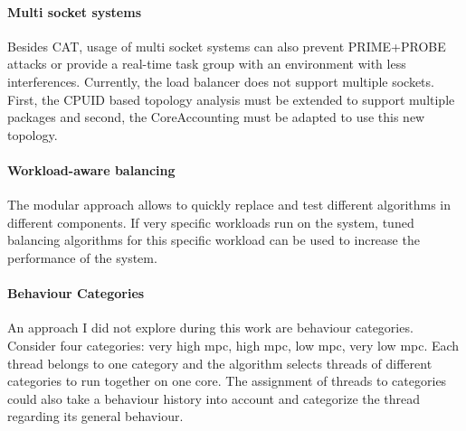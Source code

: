 \paragraph{Multi socket systems}
Besides CAT, usage of multi socket systems can also prevent PRIME+PROBE attacks
or provide a real-time task group with an environment with less interferences.
Currently, the load balancer does not support multiple sockets.
First, the CPUID based topology analysis must be extended to support multiple
packages and second, the CoreAccounting must be adapted to use this new
topology.

\paragraph{Workload-aware balancing}
The modular approach allows to quickly replace and test different algorithms in
different components.
If very specific workloads run on the system, tuned balancing algorithms for
this specific workload can be used to increase the performance of the system.


\paragraph{Behaviour Categories}
An approach I did not explore during this work are behaviour categories.
Consider four categories: very high \gls{mpc}, high \gls{mpc}, low \gls{mpc},
very low \gls{mpc}.
Each thread belongs to one category and the algorithm selects threads of
different categories to run together on one core.
The assignment of threads to categories could also take a behaviour history
into account and categorize the thread regarding its general behaviour.


\cleardoublepage

